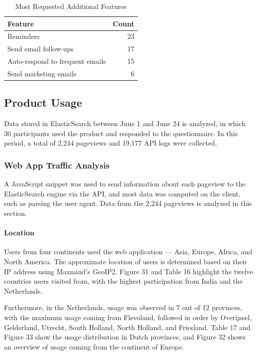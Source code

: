 \documentclass{article}
\begin{document}
\begin{table}[!htb]
	\begin{minipage}{1\linewidth}
		\caption{Most Requested Additional Features}
		\centering
		\begin{tabular}{lr}
			\hline
			\textbf{Feature}                & \textbf{Count} \\
			\hline
			Reminders                       & 23             \\
			Send email follow-ups           & 17             \\
			Auto-respond to frequent emails & 15             \\
			Send marketing emails           & 6              \\
			\hline
		\end{tabular}
	\end{minipage}%
\end{table}

\subsection{Product Usage}

Data stored in ElasticSearch between June 1 and June 24 is analyzed, in which 30 participants used the product and responded to the questionnaire. In this period, a total of 2,244 pageviews and 19,177 API logs were collected.

\subsubsection{Web App Traffic Analysis}

A JavaScript snippet was used to send information about each pageview to the ElasticSearch engine via the API, and most data was computed on the client, such as parsing the user agent. Data from the 2,244 pageviews is analyzed in this section.

\paragraph{Location}

Users from four continents used the web application --- Asia, Europe, Africa, and North America. The approximate location of users is determined based on their IP address using Maxmind's GeoIP2. Figure 31 and Table 16 highlight the twelve countries users visited from, with the highest participation from India and the Netherlands.

Furthermore, in the Netherlands, usage was observed in 7 out of 12 provinces, with the maximum usage coming from Flevoland, followed in order by Overijssel, Gelderland, Utrecht, South Holland, North Holland, and Friesland. Table 17 and Figure 33 show the usage distribution in Dutch provinces, and Figure 32 shows an overview of usage coming from the continent of Europe.
\end{document}
